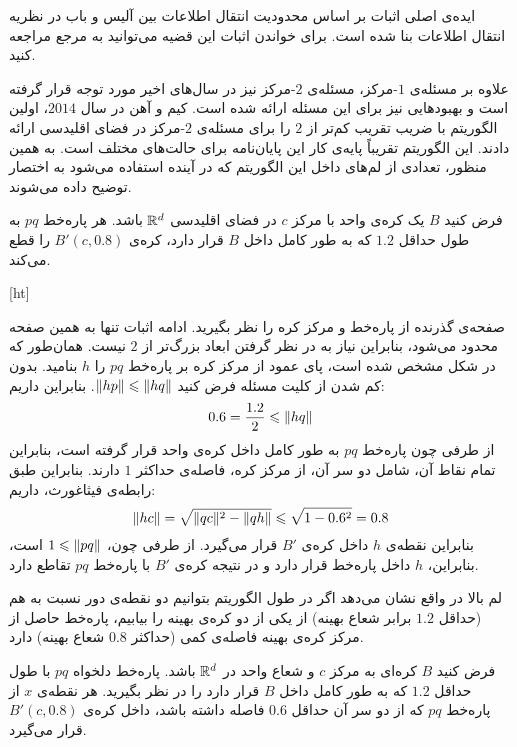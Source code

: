 
ایده‌ی اصلی اثبات بر اساس محدودیت انتقال اطلاعات بین آلیس و باب در نظریه انتقال اطلاعات بنا شده است.
برای خواندن اثبات این قضیه می‌توانید به مرجع  مراجعه کنید.



علاوه بر مسئله‌ی $1$-مرکز، مسئله‌ی $2$-مرکز نیز در سال‌های اخیر مورد توجه قرار گرفته است و بهبودهایی نیز برای این مسئله ارائه شده است.
کیم و آهن  در سال $2014$، اولین الگوریتم با ضریب تقریب کم‌تر از $2$ را برای مسئله‌ی $2$-مرکز در فضای اقلیدسی ارائه دادند.
این الگوریتم تقریباً پایه‌ی کار این پایان‌نامه برای حالت‌های مختلف است.
به همین منظور، تعدادی از لم‌های داخل این الگوریتم که در آینده استفاده می‌شود به اختصار توضیح داده می‌شوند.


فرض کنید $B$ یک کره‌ی واحد با مرکز $c$ در فضای اقلیدسی $\mathbb{R}^d$ باشد.
هر پاره‌خط $pq$ به طول حداقل $1.2$ که به طور کامل داخل $B$ قرار دارد، کره‌ی $B'(c, 0.8)$ را قطع می‌کند.

[ht]


صفحه‌ی گذرنده از پاره‌خط و مرکز کره را نظر بگیرید.
ادامه اثبات تنها به همین صفحه محدود می‌شود، بنابراین نیاز به در نظر گرفتن ابعاد بزرگ‌تر از $2$ نیست.
همان‌طور که در شکل  مشخص شده است، پای عمود از مرکز کره بر پاره‌خط $pq$ را $h$ بنامید.
بدون کم شدن از کلیت مسئله فرض کنید $\|{hp}\| \leqslant \|{hq}\|$. بنابراین داریم:
$$0.6 = \frac{1.2}{2} \leqslant \|{hq}\|$$
از‌ طرفی چون پاره‌خط $pq$ به طور کامل داخل کره‌ی واحد قرار گرفته است، بنابراین تمام نقاط آن، شامل دو سر آن، از مرکز کره، فاصله‌ی حداکثر $1$ دارند.
بنابراین طبق رابطه‌ی فیثاغورث، داریم:
$$\|{hc}\| = \sqrt{\|{qc}\|^2 - \|{qh}\|} \leqslant \sqrt{1 - 0.6^2} = 0.8$$
بنابراین نقطه‌ی $h$ داخل کره‌ی $B'$ قرار می‌گیرد.
از طرفی چون، $1 \leqslant \|{pq}\|$ است، بنابراین، $h$ داخل پاره‌خط قرار دارد و در نتیجه کره‌ی $B'$ با پاره‌خط $pq$ تقاطع دارد. 


لم بالا در واقع نشان می‌دهد اگر در طول الگوریتم بتوانیم دو نقطه‌ی دور نسبت به هم (حداقل $1.2$ برابر شعاع بهینه) از یکی از دو کره‌ی بهینه را بیابیم، پاره‌خط حاصل از مرکز کره‌ی بهینه فاصله‌ی کمی (حداکثر $0.8$ شعاع بهینه) دارد.

فرض کنید $B$ کره‌ای به مرکز $c$ و شعاع واحد در $\mathbb{R}^d$ باشد.
پاره‌خط دلخواه $pq$ با طول حداقل $1.2$ که به طور کامل داخل $B$ قرار دارد را در نظر بگیرید.
هر نقطه‌ی $x$ از پاره‌خط $pq$ که از دو سر آن حداقل $0.6$ فاصله داشته باشد، داخل کره‌ی $B'(c, 0.8)$ قرار می‌گیرد.

